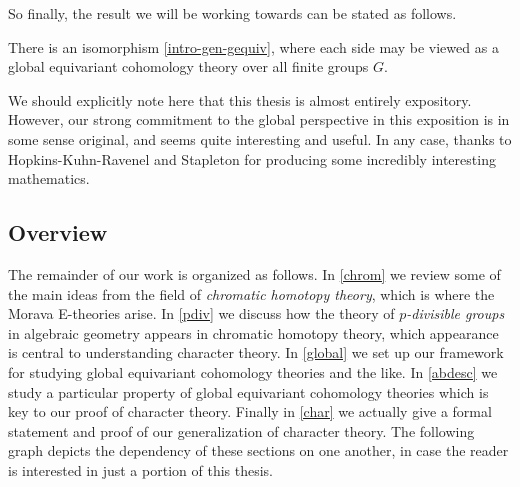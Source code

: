 So finally, the result we will be working towards can be stated as
follows.

\begin{theorem}[Informal]
  \label{intro-main-informal}
  There is an isomorphism \cref{intro-gen-gequiv}, where each side may
  be viewed as a global equivariant cohomology theory over all finite
  groups $G$.
\end{theorem}

\begin{remark}
  \label{intro-credit}
  We should explicitly note here that this thesis is almost entirely
  expository. However, our strong commitment to the global perspective
  in this exposition is in some sense original, and seems quite
  interesting and useful. In any case, thanks to Hopkins-Kuhn-Ravenel
  and Stapleton for producing some incredibly interesting mathematics.
\end{remark}


\subsection{Overview}
\label{intro-overview}

The remainder of our work is organized as follows. In \cref{chrom} we
review some of the main ideas from the field of \emph{chromatic
  homotopy theory}, which is where the Morava E-theories arise. In
\cref{pdiv} we discuss how the theory of \emph{$p$-divisible groups}
in algebraic geometry appears in chromatic homotopy theory, which
appearance is central to understanding character theory. In
\cref{global} we set up our framework for studying global equivariant
cohomology theories and the like. In \cref{abdesc} we study a
particular property of global equivariant cohomology theories which is
key to our proof of character theory. Finally in \cref{char} we
actually give a formal statement and proof of our generalization of
character theory. The following graph depicts the dependency of these
sections on one another, in case the reader is interested in just a
portion of this thesis.

